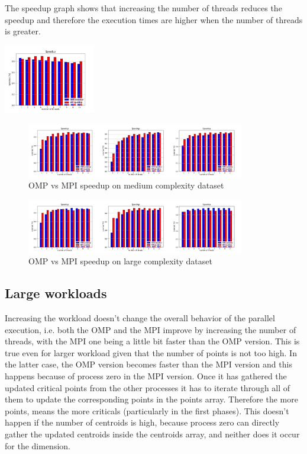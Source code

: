 \documentclass[conference]{IEEEtran}
\begin{document}
The speedup graph shows that increasing the number of threads reduces the speedup and therefore the execution times are higher when the number of threads is greater.
\centerline{\includegraphics[width = 0.3\textwidth]{imgs/suiono.jpg}}

\begin{figure}
  \centering
  \caption{OMP vs MPI speedup on medium complexity dataset}
  \label{fig:su_res}
  \includegraphics[width = 0.85\textwidth]{imgs/sumedpts.jpg}
\end{figure}
\begin{figure}
  \centering
  \caption{OMP vs MPI speedup on large complexity dataset}
  \label{fig:suslow}
  \includegraphics[width = 0.85\textwidth]{imgs/suhghpts.jpg}
\end{figure}

\subsection{Large workloads}
Increasing the workload doesn't change the overall behavior of the parallel execution, i.e. both the OMP and the MPI improve by increasing the number of threads, with the MPI one being a little bit faster than the OMP version. This is true even for larger workload given that the number of points is not too high. In the latter case, the OMP version becomes faster than the MPI version and this happens because of process zero in the MPI version. 
Once it has gathered the updated critical points from the other processes it has to iterate through all of them to update the corresponding points in the points array. Therefore the more points, means the more criticals (particularly in the first phases). This doesn't happen if the number of centroids is high, because process zero can directly gather the updated centroids inside the centroids array, and neither does it occur for the dimension.
\end{document}
